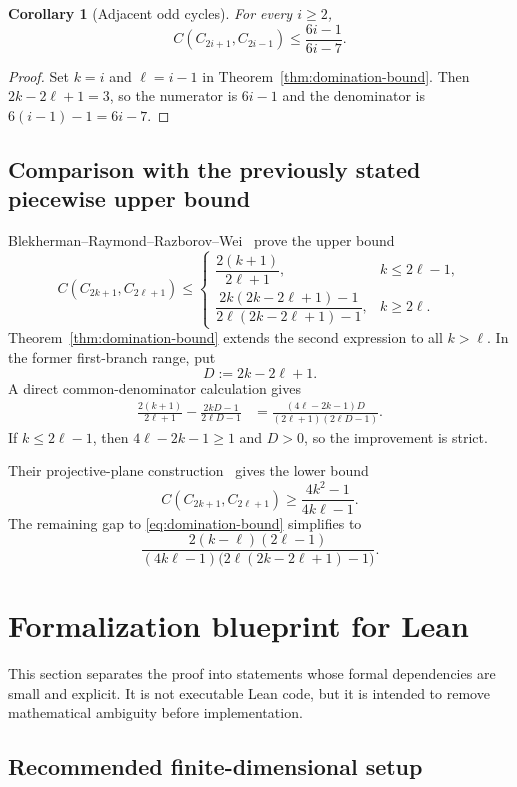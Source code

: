 \documentclass[11pt]{article}
\newtheorem{corollary}[theorem]{Corollary}
\newcommand{\1}{\mathbf{1}}
\begin{document}
\begin{corollary}[Adjacent odd cycles]
For every $i\ge2$,
\[
  C(C_{2i+1},C_{2i-1})
  \le
  \frac{6i-1}{6i-7}.
\]
\end{corollary}

\begin{proof}
Set $k=i$ and $\ell=i-1$ in
Theorem~\ref{thm:domination-bound}.  Then
$2k-2\ell+1=3$, so the numerator is $6i-1$ and the denominator is
$6(i-1)-1=6i-7$.
\end{proof}

\subsection{Comparison with the previously stated piecewise upper bound}

Blekherman--Raymond--Razborov--Wei~\cite{BRRW2025} prove the upper bound
\[
 C(C_{2k+1},C_{2\ell+1})
 \le
 \begin{cases}
 \dfrac{2(k+1)}{2\ell+1},&k\le2\ell-1,\\[2mm]
 \dfrac{2k(2k-2\ell+1)-1}
       {2\ell(2k-2\ell+1)-1},&k\ge2\ell.
 \end{cases}
\]
Theorem~\ref{thm:domination-bound} extends the second expression to all
$k>\ell$.  In the former first-branch range, put
\[
  D:=2k-2\ell+1.
\]
A direct common-denominator calculation gives
\[
\begin{aligned}
  \frac{2(k+1)}{2\ell+1}
  -\frac{2kD-1}{2\ell D-1}
  &=\frac{(4\ell-2k-1)D}
  {(2\ell+1)(2\ell D-1)}.
\end{aligned}
\]
If $k\le2\ell-1$, then $4\ell-2k-1\ge1$ and $D>0$, so the improvement is
strict.

Their projective-plane construction~\cite{BRRW2025} gives the lower bound
\[
  C(C_{2k+1},C_{2\ell+1})
  \ge
  \frac{4k^2-1}{4k\ell-1}.
\]
The remaining gap to \eqref{eq:domination-bound} simplifies to
\[
  \frac{2(k-\ell)(2\ell-1)}
  {(4k\ell-1)\bigl(2\ell(2k-2\ell+1)-1\bigr)}.
\]

\section{Formalization blueprint for Lean}
\label{sec:lean}

This section separates the proof into statements whose formal dependencies are
small and explicit.  It is not executable Lean code, but it is intended to
remove mathematical ambiguity before implementation.

\subsection{Recommended finite-dimensional setup}
\end{document}
